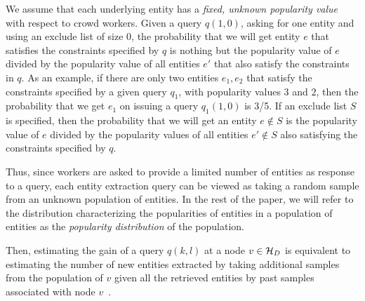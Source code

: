  We assume that each underlying entity has a {\em fixed, unknown popularity value} with respect to crowd workers. Given a query $q(1, 0)$, asking for one entity and using an exclude list of size $0$, the probability that we will get entity $e$ that satisfies the constraints specified by $q$ is nothing but the popularity value of $e$ divided by the popularity value of all entities $e'$ that also satisfy the constraints in $q$. As an example, if there are only two entities $e_1, e_2$ that satisfy the constraints specified by a given query $q_1$, with popularity values $3$ and $2$,
then the probability that we get $e_1$ on issuing a query $q_1(1, 0)$ is 3/5. 
If an exclude list $S$ is specified, then the probability that we will get an entity $e \notin S$ is the popularity value of $e$ divided by the popularity values of all entities $e' \notin S$ also satisfying the constraints specified by $q$. 

Thus, since workers are asked to provide a limited number of entities as response to a query, each entity extraction query can be viewed as taking a random sample from an unknown population of entities. In the rest of the paper, we will refer to the distribution characterizing the popularities of entities in a population of entities as the {\em popularity distribution} of the population. 


Then, estimating the gain of a query $q(k,l)$ at a node $v \in \mathcal{H}_D$ is equivalent to estimating the number of new entities extracted by taking additional samples from the population of $v$ given all the retrieved entities by past samples associated with node $v$~\cite{trushkowsky:2013}. 

